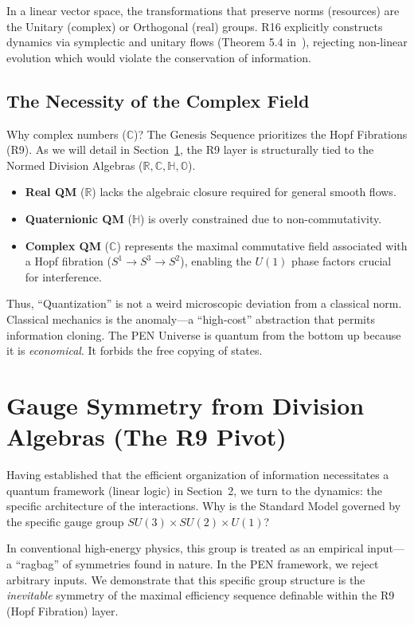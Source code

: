 \documentclass[12pt,a4paper]{article}
\theoremstyle{definition}
\newcommand{\R}{\mathbb{R}}
\newcommand{\C}{\mathbb{C}}
\newcommand{\HH}{\mathbb{H}}
\newcommand{\OO}{\mathbb{O}}
\newcommand{\SM}{SU(3) \times SU(2) \times U(1)}
\begin{document}
In a linear vector space, the transformations that preserve norms (resources) are the Unitary (complex) or Orthogonal (real) groups. R16 explicitly constructs dynamics via symplectic and unitary flows (Theorem 5.4 in~\cite{genesis}), rejecting non-linear evolution which would violate the conservation of information.

\subsection{The Necessity of the Complex Field}

Why complex numbers ($\C$)? The Genesis Sequence prioritizes the Hopf Fibrations (R9). As we will detail in Section~\ref{sec:gauge}, the R9 layer is structurally tied to the Normed Division Algebras ($\R, \C, \HH, \OO$).

\begin{itemize}[leftmargin=2em]
    \item \textbf{Real QM} ($\R$) lacks the algebraic closure required for general smooth flows.
    \item \textbf{Quaternionic QM} ($\HH$) is overly constrained due to non-commutativity.
    \item \textbf{Complex QM} ($\C$) represents the maximal commutative field associated with a Hopf fibration ($S^1 \to S^3 \to S^2$), enabling the $U(1)$ phase factors crucial for interference.
\end{itemize}

Thus, ``Quantization'' is not a weird microscopic deviation from a classical norm. Classical mechanics is the anomaly—a ``high-cost'' abstraction that permits information cloning. The PEN Universe is quantum from the bottom up because it is \emph{economical}. It forbids the free copying of states.

\section{Gauge Symmetry from Division Algebras (The R9 Pivot)}
\label{sec:gauge}

Having established that the efficient organization of information necessitates a quantum framework (linear logic) in Section~2, we turn to the dynamics: the specific architecture of the interactions. Why is the Standard Model governed by the specific gauge group $\SM$?

In conventional high-energy physics, this group is treated as an empirical input—a ``ragbag'' of symmetries found in nature. In the PEN framework, we reject arbitrary inputs. We demonstrate that this specific group structure is the \emph{inevitable} symmetry of the maximal efficiency sequence definable within the R9 (Hopf Fibration) layer.
\end{document}
